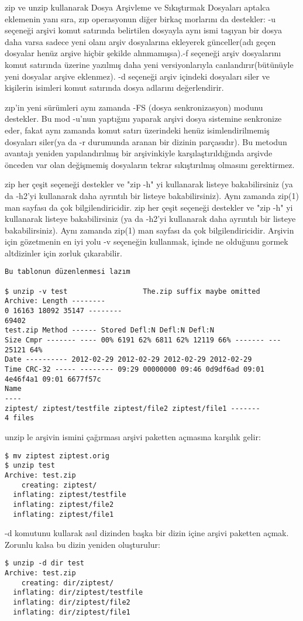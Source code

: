 \documentclass[10pt,a5paper]{book}
\begin{document}
\begin{section}{zip ve unzip kullanarak Dosya Arşivleme ve Sıkıştırmak}
Dosyaları aptalca eklemenin yanı sıra, zıp operasyonun diğer birkaç morlarını da destekler:  -u seçeneği arşivi komut satırında belirtilen dosyayla aynı ismi taşıyan bir dosya daha varsa sadece yeni olanı arşiv dosyalarına ekleyerek günceller(adı geçen dosyalar henüz arşive hiçbir şekilde alınmamışsa).-f seçeneği arşiv dosyalarını komut satırında üzerine yazılmış daha yeni versiyonlarıyla canlandırır(bütünüyle yeni dosyalar arşive eklenmez). -d seçeneği arşiv içindeki dosyaları siler ve kişilerin isimleri komut satırında dosya adlarını değerlendirir.

zıp'in yeni sürümleri aynı zamanda -FS (dosya senkronizasyon) modunu destekler. Bu mod -u'nun yaptığını yaparak arşivi dosya sistemine senkronize eder, fakat aynı zamanda komut satırı üzerindeki henüz isimlendirilmemiş dosyaları siler(ya da -r durumunda aranan bir dizinin parçasıdır). Bu metodun avantajı yeniden yapılandırılmış bir arşivinkiyle karşılaştırıldığında arşivde önceden var olan değişmemiş dosyaların tekrar sıkıştırılmış olmasını gerektirmez.

zip her çeşit seçeneği destekler ve "zip -h" yi kullanarak listeye bakabilirsiniz (ya da -h2'yi kullanarak daha ayrıntılı bir listeye bakabilirsiniz). Aynı zamanda zip(1) man sayfası da çok bilgilendiricidir.
zip her çeşit seçeneği destekler ve "zip -h" yi kullanarak listeye bakabilirsiniz (ya da -h2'yi kullanarak daha ayrıntılı bir listeye bakabilirsiniz). Aynı zamanda zip(1) man sayfası da çok bilgilendiricidir.
Arşivin için gözetmenin en iyi yolu -v seçeneğin kullanmak, içinde ne olduğunu gormek altdizinler için zorluk çıkarabilir.

\begin{verbatim}
Bu tablonun düzenlenmesi lazım

$ unzip -v test                  The.zip suffix maybe omitted
Archive: Length --------
0 16163 18092 35147 --------
69402
test.zip Method ------ Stored Defl:N Defl:N Defl:N
Size Cmpr ------- ---- 00% 6191 62% 6811 62% 12119 66% ------- ---
25121 64%
Date ---------- 2012-02-29 2012-02-29 2012-02-29 2012-02-29
Time CRC-32 ----- -------- 09:29 00000000 09:46 0d9df6ad 09:01 4e46f4a1 09:01 6677f57c
Name
----
ziptest/ ziptest/testfile ziptest/file2 ziptest/file1 -------
4 files
\end{verbatim}

unzip le arşivin ismini çağırması arşivi paketten açmasına karşılık gelir:
\begin{verbatim}
$ mv ziptest ziptest.orig 
$ unzip test
Archive: test.zip
    creating: ziptest/ 
  inflating: ziptest/testfile 
  inflating: ziptest/file2 
  inflating: ziptest/file1
\end{verbatim}
-d komutunu kullarak asıl dizinden başka bir dizin içine arşivi paketten açmak. Zorunlu kalsa bu dizin yeniden oluşturulur:
\begin{verbatim}
$ unzip -d dir test 
Archive: test.zip
    creating: dir/ziptest/ 
  inflating: dir/ziptest/testfile 
  inflating: dir/ziptest/file2 
  inflating: dir/ziptest/file1
\end{verbatim}


\end{section}
\end{document}
